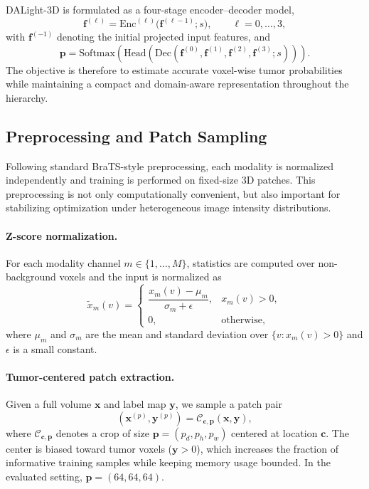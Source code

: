 \documentclass[conference]{IEEEtran}
\begin{document}
DALight-3D is formulated as a four-stage encoder--decoder model,
\begin{equation}
\mathbf{f}^{(\ell)} = \mathrm{Enc}^{(\ell)}\big(\mathbf{f}^{(\ell-1)}; s\big), \qquad \ell=0,\dots,3,
\end{equation}
with $\mathbf{f}^{(-1)}$ denoting the initial projected input features, and
\begin{equation}
\mathbf{p}=\mathrm{Softmax}\!\left(\mathrm{Head}\!\left(\mathrm{Dec}\!\left(\mathbf{f}^{(0)},\mathbf{f}^{(1)},\mathbf{f}^{(2)},\mathbf{f}^{(3)}; s\right)\right)\right).
\end{equation}
The objective is therefore to estimate accurate voxel-wise tumor probabilities while maintaining a compact and domain-aware representation throughout the hierarchy.

\subsection{Preprocessing and Patch Sampling}
\label{sec:preprocess}

Following standard BraTS-style preprocessing, each modality is normalized independently and training is performed on fixed-size 3D patches. This preprocessing is not only computationally convenient, but also important for stabilizing optimization under heterogeneous image intensity distributions.

\paragraph{Z-score normalization.}
For each modality channel $m \in \{1,\dots,M\}$, statistics are computed over non-background voxels and the input is normalized as
\begin{equation}
\tilde{x}_{m}(v) =
\begin{cases}
\dfrac{x_m(v) - \mu_m}{\sigma_m + \epsilon}, & x_m(v) > 0, \\
0, & \text{otherwise},
\end{cases}
\end{equation}
where $\mu_m$ and $\sigma_m$ are the mean and standard deviation over $\{v : x_m(v) > 0\}$ and $\epsilon$ is a small constant.

\paragraph{Tumor-centered patch extraction.}
Given a full volume $\mathbf{x}$ and label map $\mathbf{y}$, we sample a patch pair
\begin{equation}
(\mathbf{x}^{(p)},\mathbf{y}^{(p)}) = \mathcal{C}_{\mathbf{c},\mathbf{p}}(\mathbf{x},\mathbf{y}),
\end{equation}
where $\mathcal{C}_{\mathbf{c},\mathbf{p}}$ denotes a crop of size $\mathbf{p}=(p_d,p_h,p_w)$ centered at location $\mathbf{c}$. The center is biased toward tumor voxels ($\mathbf{y}>0$), which increases the fraction of informative training samples while keeping memory usage bounded. In the evaluated setting, $\mathbf{p}=(64,64,64)$.
\end{document}
